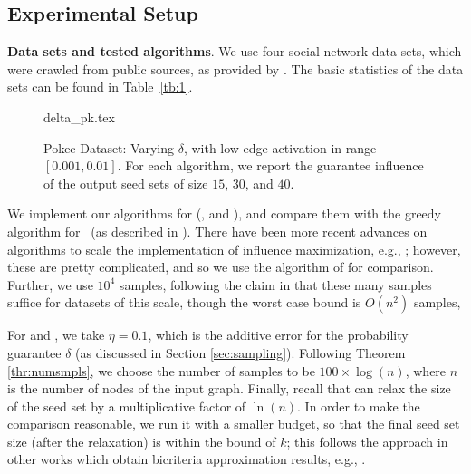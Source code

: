 \subsection{Experimental Setup}

\noindent
\textbf{Data sets and tested algorithms}. We use four social network data sets, which were crawled from public sources,
as provided by \cite{snapnets}. The basic statistics of the data sets can be found in Table~\ref{tb:1}.
\begin{figure}
\captionsetup{belowskip=-0.2in}
\resizebox{0.4\textwidth}{!}
{
  {delta_pk.tex}
}
\caption{
\small
Pokec Dataset: Varying $\delta$, with low edge activation in range $[0.001, 0.01]$. For each algorithm, we report the guarantee influence of the output
seed sets of size $15$, $30$, and $40$.
}
\label{fig:vdelta}
\end{figure}
%

We implement our algorithms for \infprob{} (\infprobheu, and
\multicritalgo), and compare them with the greedy algorithm for \infmax\ (as described in \cite{v011a004}). 
There have been more recent advances on algorithms to scale the implementation of influence maximization, e.g., \cite{borgs2014maximizing,chen2010scalable,tang2014influence,tang2015influence}; however, these are pretty complicated, and so we use the algorithm of \cite{v011a004} for comparison.
Further, we use $10^4$ samples, following the claim in \cite{v011a004} that these many samples suffice for datasets of this scale, though the worst case bound is  $O(n^2)$ samples, 


For \infprobheu{} and \multicritalgo{}, we take $\eta=0.1$, which is the additive error for the
probability guarantee $\delta$ (as discussed in Section \ref{sec:sampling}).
Following Theorem \ref{thr:numsmpls}, we choose the number of samples to be $100 \times \log(n)$, where $n$ is the number of nodes of the input graph.
Finally, recall that \multicritalgo{} can relax the size of the seed set by a multiplicative factor of $\ln(n)$. In order to make the comparison reasonable, we run it with a smaller budget, so that the final seed set size (after the relaxation) is within the bound of $k$; this follows the approach in other works which obtain bicriteria approximation results, e.g., \cite{krause:jmlr08}.

